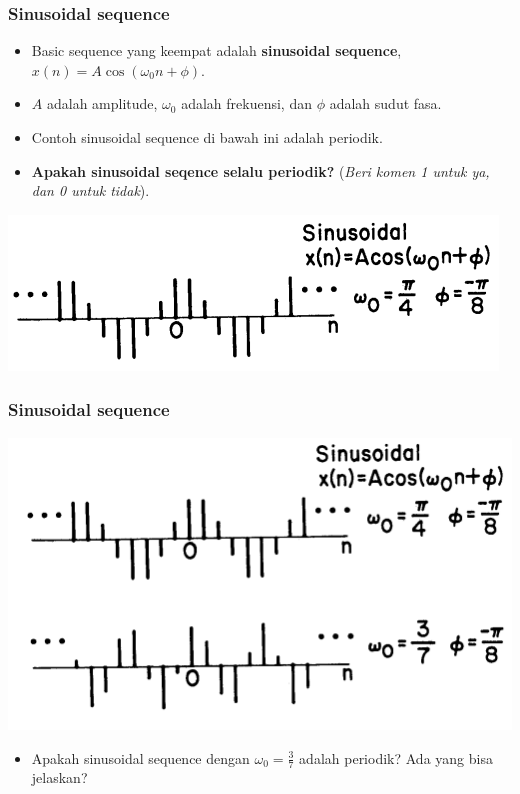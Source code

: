 \documentclass[pdflatex,compress]{beamer}
\begin{document}
\begin{frame}
	\frametitle{Sinusoidal sequence}
	\begin{itemize}
		\item Basic sequence yang keempat adalah \textbf{sinusoidal sequence}, $ x(n) = A\cos(\omega_0 n + \phi) $.
		\item $ A $ adalah amplitude, $ \omega_0 $ adalah frekuensi, dan $ \phi $ adalah sudut fasa.
		\item Contoh sinusoidal sequence di bawah ini adalah periodik.
		\item \textbf{Apakah sinusoidal seqence selalu periodik?} (\textit{Beri komen 1 untuk ya, dan 0 untuk tidak}).
	\end{itemize}
	\begin{center}
		\includegraphics[width=0.8\linewidth]{img/img010}
	\end{center}
\end{frame}

\begin{frame}
	\frametitle{Sinusoidal sequence}
	\begin{center}
		\includegraphics[width=0.8\linewidth]{img/img011}
	\end{center}
	\begin{itemize}
		\item Apakah sinusoidal sequence dengan $ \omega_0 = \frac{3}{7} $ adalah periodik? Ada yang bisa jelaskan?
	\end{itemize}
\end{frame}
\end{document}
